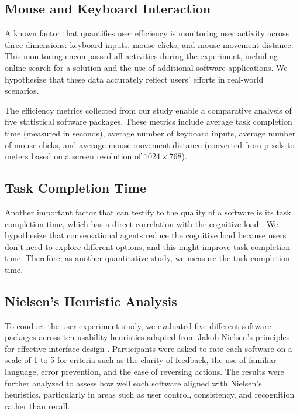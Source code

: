 \documentclass{article}
\begin{document}
\subsection{Mouse and Keyboard Interaction}
A known factor that quantifies user efficiency \cite{Souza2021} is monitoring user activity across three dimensions: keyboard inputs, mouse clicks, and mouse movement distance. This monitoring encompassed all activities during the experiment, including online search for a solution and the use of additional software applications. We hypothesize that these data accurately reflect users' efforts in real-world scenarios.

The efficiency metrics collected from our study enable a comparative analysis of five statistical software packages. These metrics include average task completion time (measured in seconds), average number of keyboard inputs, average number of mouse clicks, and average mouse movement distance (converted from pixels to meters based on a screen resolution of $1024\times768$).

\subsection{Task Completion Time}
Another important factor that can testify to the quality of a software is its task completion time, which has a direct correlation with the cognitive load \cite{longo2018experienced}. We hypothesize that conversational agents reduce the cognitive load because users don't need to explore different options, and this might improve task completion time. Therefore, as another quantitative study, we measure the task completion time.

\subsection{Nielsen's Heuristic Analysis}
To conduct the user experiment study, we evaluated five different software packages across ten usability heuristics adapted from Jakob Nielsen's principles for effective interface design \cite{Nielsen1994}. Participants were asked to rate each software on a scale of 1 to 5 for criteria such as the clarity of feedback, the use of familiar language, error prevention, and the ease of reversing actions. The results were further analyzed to assess how well each software aligned with Nielsen's heuristics, particularly in areas such as user control, consistency, and recognition rather than recall.
\end{document}
